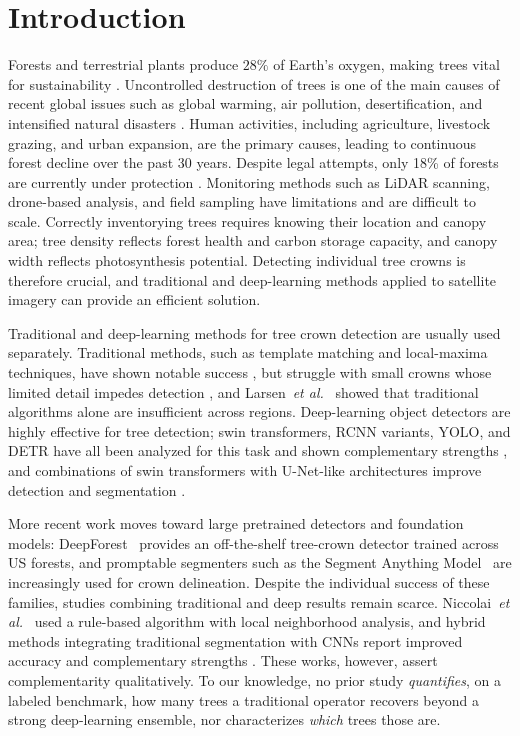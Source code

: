 \documentclass{article}
\begin{document}
\section{Introduction}\label{sect:intro}

Forests and terrestrial plants produce $28\%$ of Earth's oxygen, making trees vital for sustainability \cite{GFRA}. Uncontrolled destruction of trees is one of the main causes of recent global issues such as global warming, air pollution, desertification, and intensified natural disasters \cite{forest_climate_change, forest_carbon_emission}. Human activities, including agriculture, livestock grazing, and urban expansion, are the primary causes, leading to continuous forest decline over the past 30 years. Despite legal attempts, only 18\% of forests are currently under protection \cite{GFRA, brazilian_law, turkey_law_1, turkey_law_2}. Monitoring methods such as LiDAR scanning, drone-based analysis, and field sampling have limitations and are difficult to scale. Correctly inventorying trees requires knowing their location and canopy area; tree density reflects forest health and carbon storage capacity, and canopy width reflects photosynthesis potential. Detecting individual tree crowns is therefore crucial, and traditional and deep-learning methods applied to satellite imagery can provide an efficient solution.

Traditional and deep-learning methods for tree crown detection are usually used separately. Traditional methods, such as template matching and local-maxima techniques, have shown notable success \cite{Korpela20032006, huo2020individual}, but struggle with small crowns whose limited detail impedes detection \cite{Korpela20032006}, and Larsen~\emph{et al.}~\cite{larsen2011comparison} showed that traditional algorithms alone are insufficient across regions. Deep-learning object detectors are highly effective for tree detection; swin transformers, RCNN variants, YOLO, and DETR have all been analyzed for this task and shown complementary strengths \cite{durgut2025multi}, and combinations of swin transformers with U-Net-like architectures improve detection and segmentation \cite{xiao2023csswin, ren2024local}.

More recent work moves toward large pretrained detectors and foundation models: DeepForest~\cite{weinstein2019individual, weinstein2020deepforest} provides an off-the-shelf tree-crown detector trained across US forests, and promptable segmenters such as the Segment Anything Model~\cite{kirillov2023segment} are increasingly used for crown delineation. Despite the individual success of these families, studies combining traditional and deep results remain scarce. Niccolai~\emph{et al.}~\cite{niccolai2010decision} used a rule-based algorithm with local neighborhood analysis, and hybrid methods integrating traditional segmentation with CNNs report improved accuracy and complementary strengths \cite{korznikov2021using, moussaid2021tree}. These works, however, assert complementarity qualitatively. To our knowledge, no prior study \emph{quantifies}, on a labeled benchmark, how many trees a traditional operator recovers beyond a strong deep-learning ensemble, nor characterizes \emph{which} trees those are.
\end{document}
